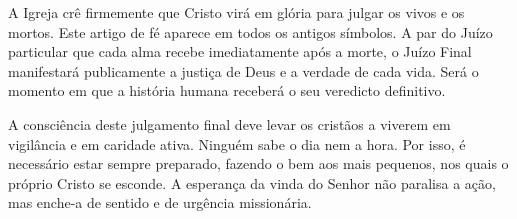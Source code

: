 A Igreja crê firmemente que Cristo virá em glória para julgar os vivos e os mortos. Este artigo de fé aparece em todos os antigos símbolos. A par do Juízo particular que cada alma recebe imediatamente após a morte, o Juízo Final manifestará publicamente a justiça de Deus e a verdade de cada vida. Será o momento em que a história humana receberá o seu veredicto definitivo.

A consciência deste julgamento final deve levar os cristãos a viverem em vigilância e em caridade ativa. Ninguém sabe o dia nem a hora. Por isso, é necessário estar sempre preparado, fazendo o bem aos mais pequenos, nos quais o próprio Cristo se esconde. A esperança da vinda do Senhor não paralisa a ação, mas enche-a de sentido e de urgência missionária.
